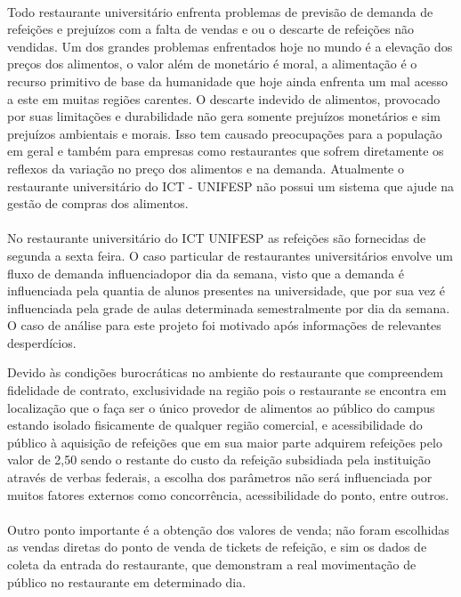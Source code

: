 \documentclass[	12pt, Times, openright, twoside, a4paper, english, brazil]{abntex2}
\begin{document}
\paragraph*{} Todo restaurante universitário enfrenta problemas de previsão de demanda de refeições e prejuízos com a falta de vendas e ou o descarte de refeições não vendidas. Um dos grandes problemas enfrentados hoje no mundo é a elevação dos preços dos alimentos, o valor além de monetário é moral, a alimentação é o recurso primitivo de base da humanidade que hoje ainda enfrenta um mal acesso a este em muitas regiões carentes. O descarte indevido de alimentos, provocado por suas limitações e durabilidade não gera somente prejuízos monetários e sim prejuízos ambientais e morais. Isso tem causado preocupações para a população em geral e também para empresas como restaurantes que sofrem diretamente os reflexos da variação no preço dos alimentos e na demanda. Atualmente o restaurante universitário do ICT - UNIFESP não possui um sistema que ajude na gestão de compras dos alimentos.

\paragraph*{} No restaurante universitário do ICT UNIFESP as refeições são fornecidas de segunda a sexta feira. O caso particular de restaurantes universitários envolve um fluxo de demanda influenciadopor dia da semana, visto que a demanda é influenciada pela quantia de alunos presentes na universidade, que por sua vez é influenciada pela grade de aulas determinada semestralmente por dia da semana. O caso de análise para este projeto foi motivado após informações de relevantes desperdícios.

Devido às condições burocráticas no ambiente do restaurante que compreendem fidelidade de contrato, exclusividade na região pois o restaurante se encontra em localização que o faça ser o único provedor de alimentos ao público do campus estando isolado fisicamente de qualquer região comercial, e acessibilidade do público à aquisição de refeições que em sua maior parte adquirem refeições pelo valor de 2,50 sendo o restante do custo da refeição subsidiada pela instituição através de verbas federais, a escolha dos parâmetros não será influenciada por muitos fatores externos como concorrência, acessibilidade do ponto, entre outros.

\paragraph*{} Outro ponto importante é a obtenção dos valores de venda; não foram escolhidas as vendas diretas do ponto de venda de tickets de refeição, e sim os dados de coleta da entrada do restaurante, que demonstram a real movimentação de público no restaurante em determinado dia.
\end{document}
